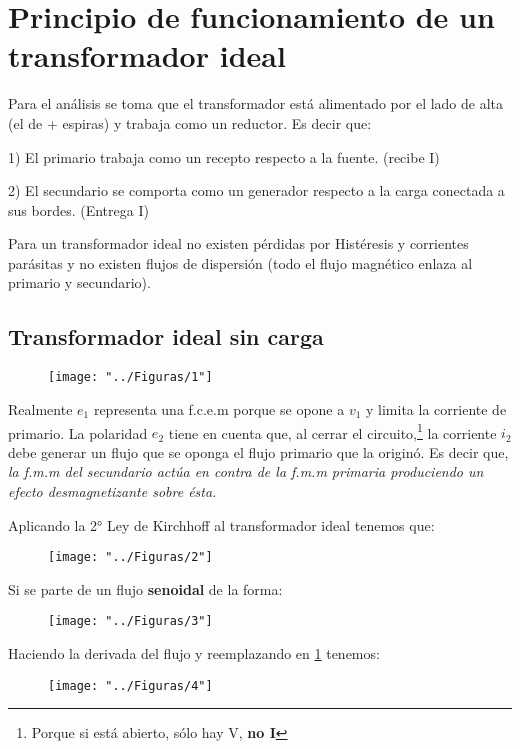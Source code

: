 \section{Principio de funcionamiento de un transformador ideal}

Para el análisis se toma que el transformador está alimentado por el lado de alta (el de + espiras) y trabaja como un reductor. Es decir que:

1) El primario trabaja como un recepto respecto a la fuente. (recibe I)

2) El secundario se comporta como un generador respecto a la carga conectada a sus bordes. (Entrega I)

Para un transformador ideal no existen pérdidas por Histéresis y corrientes parásitas y no existen flujos de dispersión (todo el flujo magnético enlaza al primario y secundario).

\subsection{Transformador ideal sin carga}
\begin{figure}[!htbp]
	\centering
	\texttt{[image: "../Figuras/1"]}
\end{figure} 

Realmente $e_{1}$ representa una f.c.e.m porque se opone a $v_{1}$ y limita la corriente de primario. La polaridad $e_{2}$ tiene en cuenta que, al cerrar el circuito,\footnote{Porque si está abierto, sólo hay V, \textbf{no I}} la corriente $i_{2}$ debe generar un flujo que se oponga el flujo primario que la originó. Es decir que, \textit{la f.m.m del secundario actúa en contra de la f.m.m primaria produciendo un efecto desmagnetizante sobre ésta.}

Aplicando la 2° Ley de Kirchhoff al transformador ideal tenemos que:

\begin{figure}[!htbp]
	\centering
	\texttt{[image: "../Figuras/2"]}
	\label{fig:voltaje}
\end{figure} 

Si se parte de un flujo \textbf{senoidal} de la forma:
\begin{figure}[!htbp]
	\centering
	\texttt{[image: "../Figuras/3"]}
\end{figure} 

Haciendo la derivada del flujo y reemplazando en \ref{fig:voltaje} tenemos:
\begin{figure}[!htbp]
	\centering
	\texttt{[image: "../Figuras/4"]}
\end{figure} 

